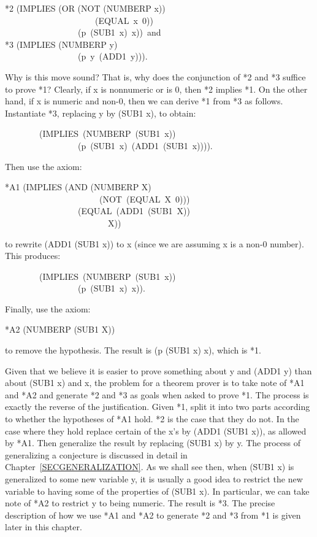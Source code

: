 \documentclass[10pt]{book}
\newenvironment{pubasis}{\begin{flushleft}}{\end{flushleft}}
\begin{document}
\begin{pubasis}
*2	(IMPLIES (OR (NOT (NUMBERP x))\\
~~~~~~~~~~~~~~~~~~~~~(EQUAL~x~0))\\
~~~~~~~~~~~~~~~~~(p~(SUB1~x)~x))~and\\

*3	(IMPLIES (NUMBERP y)\\
~~~~~~~~~~~~~~~~~(p~y~(ADD1~y))).\\
\end{pubasis}
Why is this move sound?  That is, why does the conjunction of *2
and *3 suffice to prove *1?  Clearly, if x is nonnumeric or is 0,
then *2 implies *1.  On the other hand, if x is numeric and non-0,
then we can derive *1 from *3 as follows.  Instantiate *3,
replacing y by (SUB1 x), to obtain:

\begin{pubasis}
~~~~~~~~(IMPLIES~(NUMBERP~(SUB1~x))\\
~~~~~~~~~~~~~~~~~(p~(SUB1~x)~(ADD1~(SUB1~x)))).\\
\end{pubasis}
Then use the axiom:

\begin{pubasis}
*A1	(IMPLIES (AND (NUMBERP X)\\
~~~~~~~~~~~~~~~~~~~~~~(NOT~(EQUAL~X~0)))\\
~~~~~~~~~~~~~~~~~(EQUAL~(ADD1~(SUB1~X))\\
~~~~~~~~~~~~~~~~~~~~~~~~X))\\
\end{pubasis}
to rewrite (ADD1 (SUB1 x)) to x (since we are assuming x is a non-0 number).
This produces:

\begin{pubasis}
~~~~~~~~(IMPLIES~(NUMBERP~(SUB1~x))\\
~~~~~~~~~~~~~~~~~(p~(SUB1~x)~x)).\\
\end{pubasis}
Finally, use the axiom:
\begin{pubasis}
*A2	(NUMBERP (SUB1 X))\\
\end{pubasis}
to remove the hypothesis.  The result is (p (SUB1 x) x), which is *1.

Given that we believe it is easier to prove something about y and (ADD1 y)
than about (SUB1 x) and x, the problem for a theorem prover is to take note of *A1 and *A2
and generate *2 and *3 as goals when asked to prove *1.  The process
is exactly the reverse of the justification.  Given *1, split it into
two parts according to whether the hypotheses of *A1 hold.  *2 is 
the case that they do not.  In the case where they hold replace certain of
the x's by (ADD1 (SUB1 x)), as allowed by *A1.  Then generalize the result
by replacing (SUB1 x) by y.  The process of generalizing a conjecture
is discussed in detail in Chapter~\ref{SECGENERALIZATION}.  As we shall see then,
when (SUB1 x) is generalized to some new variable y, it is usually a
good idea to restrict the new variable to having some of the properties
of (SUB1 x).  In particular, we can take note of *A2 to restrict y to
being numeric.  The result is *3.  The precise description of how we use
*A1 and *A2 to generate *2 and *3 from *1 is given later in this chapter.
\end{document}
